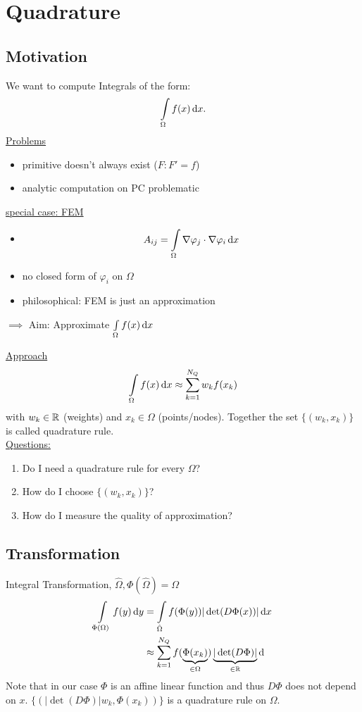 \section{Quadrature}

\subsection{Motivation}
We want to compute Integrals of the form:
\begin{align*}
	\int \limits_\Omega f(x) \mathop{}\!\mathrm{d} x.
\end{align*}
\underline{Problems}
\begin{itemize}
	\item primitive doesn't always exist ($F\colon F'=f$)
	\item analytic computation on PC problematic
\end{itemize}

 \underline{special case: FEM}
 \begin{itemize}
 	\item 
 	\begin{equation*}
 		A_{ij} = \int \limits_\Omega \nabla \varphi_j \cdot \nabla \varphi_i \mathop{}\!\mathrm{d} x
 	\end{equation*}
 	\item no closed form of $\varphi_i$ on $\Omega$
 	\item philosophical: FEM is just an approximation
 \end{itemize}

$\implies$ Aim: Approximate $\int \limits_\Omega f(x) \mathop{}\!\mathrm{d} x$

\underline{Approach}
\begin{equation*}
	\int \limits_\Omega f(x) \mathop{}\!\mathrm{d} x \approx \displaystyle \sum_{k=1}^{N_Q} w_k f(x_k)
\end{equation*}
with $w_k \in \mathbb{R}$ (weights) and $x_k \in \Omega$ (points/nodes). Together the set $\{(w_k,x_k)\}$ is called quadrature rule.\\
\underline{Questions:}
\begin{enumerate}[label=\arabic*)]
	\item Do I need a quadrature rule for every $\Omega$?
	\item How do I choose $\{(w_k,x_k)\}$?
	\item How do I measure the quality of approximation?
\end{enumerate}

\subsection{Transformation}
Integral Transformation, $\hat{\Omega}, \Phi(\hat{\Omega}) = \Omega$
\begin{align}
	\int \limits_{\Phi(\Omega)}  f(y) \mathop{}\!\mathrm{d} y &= \int \limits_{\hat{\Omega}} f(\Phi(y)) |\det(D\Phi(x))| \mathop{}\!\mathrm{d} x \\
	&\approx \displaystyle \sum^{N_Q}_{k=1} f(\underbrace{\Phi(x_k)}_{\in \Omega}) \underbrace{|\det(D\Phi)|}_{\in \mathbb{R}} \mathop{}\!\mathrm{d}
\end{align}
Note that in our case $\Phi$ is an affine linear function and thus $D\Phi$ does not depend on $x$.
$\{(|\det(D\Phi)|w_k,\Phi(x_k))\}$ is a quadrature rule on $\Omega$.
